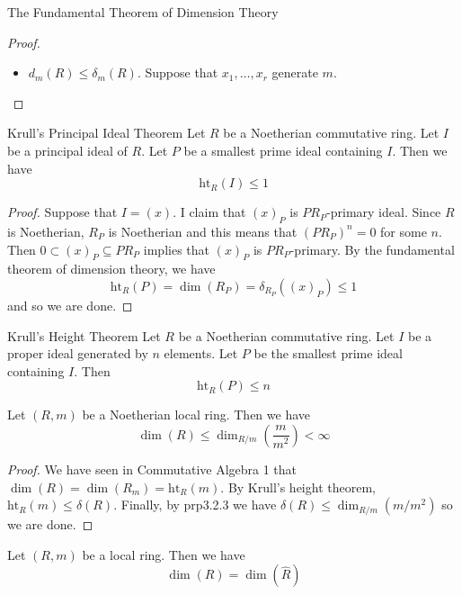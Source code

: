 \documentclass[a4paper]{article}
\begin{document}
\begin{thm}{The Fundamental Theorem of Dimension Theory}{}
\begin{proof}
\begin{itemize}
Finally, under the surjective map $p$, $R/m^n$ is sent to $A/p(m)^n$. Hence $l(R/m^n)\geq l(A/p(m)^n)$ so that $d_m(R)\geq d_m(R/P_0)$. Then combining with the above inequality we deduce that $r-1\leq d_m(R/P_0)-1\leq d_m(R)-1$ so that $r\leq d_m(R)$. Since this is true for all chains of prime ideals of $R$, we deduce that $\dim(R)\leq d_m(R)$. \\~\\

\item $d_m(R)\leq\delta_m(R)$. Suppose that $x_1,\dots,x_r$ generate $m$. 
\end{itemize}
\end{proof}
\end{thm}

\begin{thm}{Krull's Principal Ideal Theorem}{} Let $R$ be a Noetherian commutative ring. Let $I$ be a principal ideal of $R$. Let $P$ be a smallest prime ideal containing $I$. Then we have $$\text{ht}_R(I)\leq 1$$ \tcbline
\begin{proof}
Suppose that $I=(x)$. I claim that $(x)_P$ is $PR_P$-primary ideal. Since $R$ is Noetherian, $R_P$ is Noetherian and this means that $(PR_P)^n=0$ for some $n$. Then $0\subset(x)_P\subseteq PR_P$ implies that $(x)_P$ is $PR_P$-primary. By the fundamental theorem of dimension theory, we have $$\text{ht}_R(P)=\dim(R_P)=\delta_{R_P}((x)_P)\leq 1$$ and so we are done. 
\end{proof}
\end{thm}

\begin{thm}{Krull's Height Theorem}{} Let $R$ be a Noetherian commutative ring. Let $I$ be a proper ideal generated by $n$ elements. Let $P$ be the smallest prime ideal containing $I$. Then $$\text{ht}_R(P)\leq n$$
\end{thm}

\begin{prp}{}{} Let $(R,m)$ be a Noetherian local ring. Then we have $$\dim(R)\leq\dim_{R/m}\left(\frac{m}{m^2}\right)<\infty$$ \tcbline
\begin{proof}
We have seen in Commutative Algebra 1 that $\dim(R)=\dim(R_m)=\text{ht}_R(m)$. By Krull's height theorem, $\text{ht}_R(m)\leq\delta(R)$. Finally, by prp3.2.3 we have $\delta(R)\leq\dim_{R/m}(m/m^2)$ so we are done. 
\end{proof}
\end{prp}

\begin{prp}{}{} Let $(R,m)$ be a local ring. Then we have $$\dim(R)=\dim(\widehat{R})$$
\end{prp}
\end{document}

